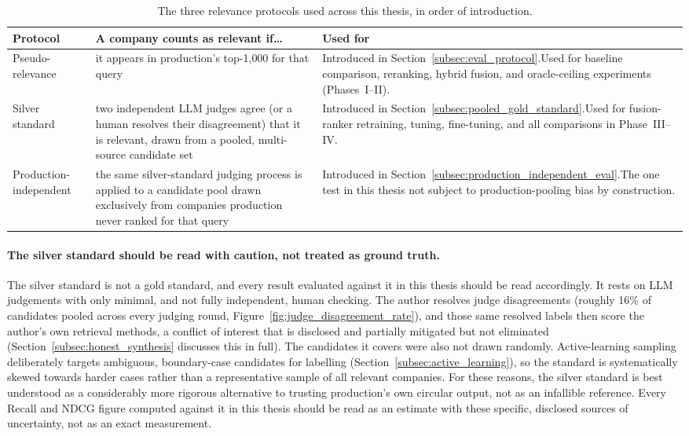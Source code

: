 \documentclass[a4paper,oneside,bibliography=totoc]{scrbook}
\begin{document}
\begin{table}[htbp]
\centering
\small
\caption{The three relevance protocols used across this thesis, in order of introduction.}
\label{tab:protocol_summary}
\setlength{\tabcolsep}{3pt}
\begin{tabular}{>{\raggedright\arraybackslash}p{2.5cm}>{\raggedright\arraybackslash}p{5.5cm}>{\raggedright\arraybackslash}p{5.5cm}}
\toprule
\textbf{Protocol} & \textbf{A company counts as relevant if\ldots} & \textbf{Used for} \\
\midrule
Pseudo-relevance & it appears in production's top-1{,}000 for that query & Introduced in Section~\ref{subsec:eval_protocol}.\newline Used for baseline comparison, reranking, hybrid fusion, and oracle-ceiling experiments (Phases~I--II). \\
Silver standard & two independent LLM judges agree (or a human resolves their disagreement) that it is relevant, drawn from a pooled, multi-source candidate set & Introduced in Section~\ref{subsec:pooled_gold_standard}.\newline Used for fusion-ranker retraining, tuning, fine-tuning, and all comparisons in Phase~III--IV. \\
Production-independent & the same silver-standard judging process is applied to a candidate pool drawn exclusively from companies production never ranked for that query & Introduced in Section~\ref{subsec:production_independent_eval}.\newline The one test in this thesis not subject to production-pooling bias by construction. \\
\bottomrule
\end{tabular}
\end{table}

\paragraph{The silver standard should be read with caution, not treated as ground truth.} The silver standard is not a gold standard, and every result evaluated against it in this thesis should be read accordingly. It rests on LLM judgements with only minimal, and not fully independent, human checking. The author resolves judge disagreements (roughly 16\% of candidates pooled across every judging round, Figure~\ref{fig:judge_disagreement_rate}), and those same resolved labels then score the author's own retrieval methods, a conflict of interest that is disclosed and partially mitigated but not eliminated (Section~\ref{subsec:honest_synthesis} discusses this in full). The candidates it covers were also not drawn randomly. Active-learning sampling deliberately targets ambiguous, boundary-case candidates for labelling (Section~\ref{subsec:active_learning}), so the standard is systematically skewed towards harder cases rather than a representative sample of all relevant companies. For these reasons, the silver standard is best understood as a considerably more rigorous alternative to trusting production's own circular output, not as an infallible reference. Every Recall and NDCG figure computed against it in this thesis should be read as an estimate with these specific, disclosed sources of uncertainty, not as an exact measurement.
\end{document}
